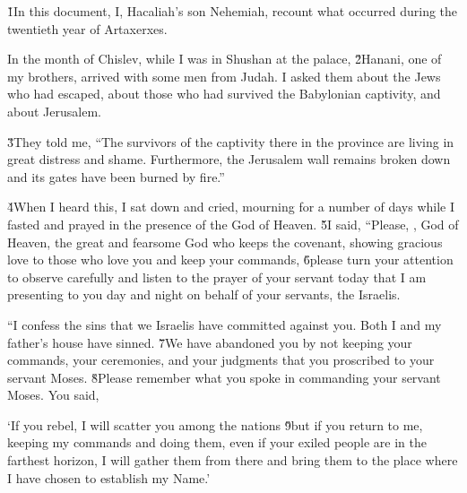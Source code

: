 


\v{1}In this document, I, Hacaliah's son Nehemiah, recount what occurred during the twentieth year of Artaxerxes.

In the month of Chislev, while I was in Shushan at the palace, \v{2}Hanani, one of my brothers, arrived with some men from Judah. I asked them about the Jews who had escaped, about those who had survived the Babylonian captivity, and about Jerusalem.

\v{3}They told me, ``The survivors of the captivity there in the province are living in great distress and shame. Furthermore, the Jerusalem wall remains broken down and its gates have been burned by fire.''

\v{4}When I heard this, I sat down and cried, mourning for a number of days while I fasted and prayed in the presence of the God of Heaven. \v{5}I said, ``Please, , God of Heaven, the great and fearsome God who keeps the covenant, showing gracious love to those who love you and keep your commands, \v{6}please turn your attention to observe carefully and listen to the prayer of your servant today that I am presenting to you day and night on behalf of your servants, the Israelis.

``I confess the sins that we Israelis have committed against you. Both I and my father's house have sinned. \v{7}We have abandoned you by not keeping your commands, your ceremonies, and your judgments that you proscribed to your servant Moses. \v{8}Please remember what you spoke in commanding your servant Moses. You said,

\begin{poetry}
\poeml `If you rebel, I will scatter you among the nations \v{9}but if you return to me, keeping my commands and doing them, even if your exiled people are in the farthest horizon, I will gather them from there and bring them to the place where I have chosen to establish my Name.'
\end{poetry}

